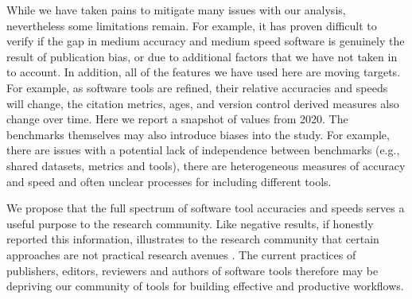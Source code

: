 \documentclass{bmcart}
\begin{document}

While we have taken pains to mitigate many issues with our analysis, nevertheless 
some limitations remain. For example, it has proven difficult to verify if the gap in medium accuracy 
and medium speed software is genuinely the result of publication bias, or due to additional factors that we have 
not taken in to account. In addition, all of the features we have used here are moving targets. For example, as software 
tools are refined, their relative accuracies and speeds will change, the citation metrics, ages, and version control 
derived measures also change over time. Here we report a snapshot of values from 2020.  The benchmarks themselves may 
also introduce biases into the study. For example, there are issues with a potential lack of independence between benchmarks 
(e.g., shared datasets, metrics and tools), there are heterogeneous measures of accuracy and speed and often unclear 
processes for including different tools. 



We propose that the full spectrum of software tool accuracies and
speeds serves a useful purpose to the research community. Like negative
results, if honestly reported this information, illustrates to the research community
that certain approaches are not practical research avenues
\cite{fanelli2012negative}. %
The current
practices of publishers, editors, reviewers and authors of software
tools therefore may be depriving our community of tools for building effective
and productive workflows.
\end{document}
